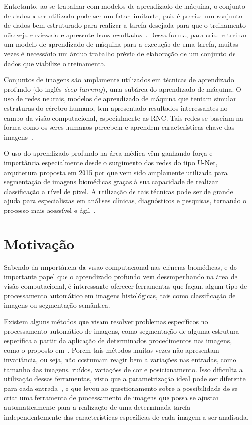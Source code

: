     Entretanto, ao se trabalhar com modelos de aprendizado de máquina, o conjunto de dados a ser utilizado pode ser um fator limitante, pois é preciso um conjunto de dados bem estruturado para realizar a tarefa desejada para que o treinamento não seja enviesado e apresente bons resultados~\cite{paullada2021data}. Dessa forma, para criar e treinar um modelo de aprendizado de máquina para a execução de uma tarefa, muitas vezes é necessário um árduo trabalho prévio de elaboração de um conjunto de dados que viabilize o treinamento.
    
    Conjuntos de imagens são amplamente utilizados em técnicas de aprendizado profundo (do inglês \textit{deep learning}), uma subárea do aprendizado de máquina. O uso de redes neurais, modelos de aprendizado de máquina que tentam simular estruturas do cérebro humano, tem apresentado resultados interessantes no campo da visão computacional, especialmente as \acf{RNC}. Tais redes se baseiam na forma como os seres humanos percebem e aprendem características chave das imagens~\cite{rawat2017deep}.
    
    O uso do aprendizado profundo na área médica vêm ganhando força e importância especialmente desde o surgimento das redes do tipo U-Net, arquitetura proposta em 2015 por \cite{ronneberger2015u} que vem sido amplamente utilizada para segmentação de imagens biomédicas graças à sua capacidade de realizar classificação a nível de pixel. A utilização de tais técnicas pode ser de grande ajuda para especialistas em análises clínicas, diagnósticos e pesquisas, tornando o processo mais acessível e ágil~\cite{esteva2021deep}.

\section{Motivação}

Sabendo da importância da visão computacional nas ciências biomédicas, e do importante papel que o aprendizado profundo vem desempenhando na área de visão computacional, é interessante oferecer ferramentas que façam algum tipo de processamento automático em imagens histológicas, tais como classificação de imagens ou segmentação semântica. 
    
    Existem alguns métodos que visam resolver problemas específicos no processamento automático de imagens, como segmentação de alguma estrutura específica a partir da aplicação de determinados procedimentos nas imagens, como o proposto em~\cite{gondim2021automatic}. Porém tais métodos muitas vezes não apresentam invariância, ou seja, não costumam reagir bem a variações nas entradas, como tamanho das imagens, ruídos, variações de cor e posicionamento. Isso dificulta a utilização dessas ferramentas, visto que a parametrização ideal pode ser diferente para cada entrada~\cite{linhares2022automated}, o que levou ao questionamento sobre a possibilidade de se criar uma ferramenta de processamento de imagens que possa se ajustar automaticamente para a realização de uma determinada tarefa independentemente das características específicas de cada imagem a ser analisada.
    
